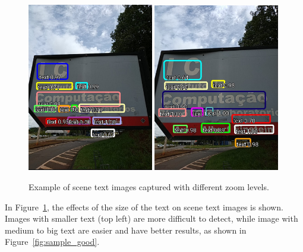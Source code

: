 \begin{figure}[h!]
\includegraphics[width=0.49\textwidth]{Mobile/images/app23.jpg}
\includegraphics[width=0.49\textwidth]{Mobile/images/app26.jpg}


\caption{Example of scene text images captured with different zoom levels.}
\label{fig:ic-zoom}
\end{figure}
In Figure~\ref{fig:ic-zoom}, the effects of the size of the text on scene text images is shown. Images with smaller text (top left) are more difficult to detect, while image with medium to big text are easier and have better results, as shown in Figure~\ref{fig:sample_good}. 



